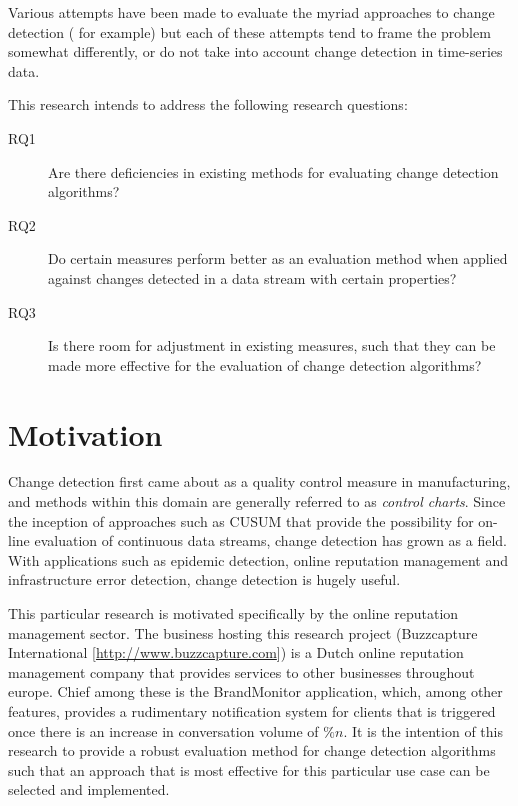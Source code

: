 \documentclass{uvamscse}	%
\begin{document}
Various attempts have been made to evaluate the myriad approaches to change detection (\cite{Buntain2014} for example)
but each of these attempts tend to frame the problem somewhat differently, or do not take into account change detection
in time-series data.

This research intends to address the following research questions:

\begin{description}
	\item[RQ1] Are there deficiencies in existing methods for evaluating change detection algorithms?
	\item[RQ2] Do certain measures perform better as an evaluation method when applied against changes detected in a 
	data stream with certain properties?
	\item[RQ3] Is there room for adjustment in existing measures, such that they can be made more effective for the 
	evaluation of change detection algorithms?
\end{description}


\section{Motivation}

Change detection first came about as a quality control measure in manufacturing, and methods within this domain are generally
referred to as \emph{control charts}. Since the inception of approaches such as CUSUM that provide the possibility for
on-line evaluation of continuous data streams, change detection has grown as a field. With applications such as epidemic
detection, online reputation management and infrastructure error detection, change detection is hugely useful.

This particular research is motivated specifically by the online reputation management sector. The business hosting this
research project (Buzzcapture International [\url{http://www.buzzcapture.com}]) is a Dutch online reputation management 
company that provides services to other businesses throughout europe. Chief among these is the BrandMonitor application,
 which, among other features, provides a rudimentary notification system for clients that is triggered once there is an
 increase in conversation volume of \(\%n\). It is the intention of this research to provide a robust evaluation method
 for change detection algorithms such that an approach that is most effective for this particular use case can be 
 selected and implemented.
\end{document}
